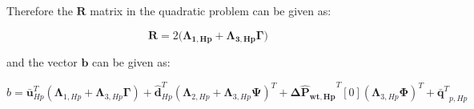 Therefore the $\bm{R}$ matrix in the quadratic problem can be given as:

\begin{equation}
  \bm{R} = 2\Big(\bm{\Lambda}_{\bm{1,Hp}} + \bm{\Lambda}_{\bm{3,Hp}} \bm{\Gamma}\Big) 
\end{equation}

and the vector $\bm{b}$ can be given as:

\begin{equation}
  b = \bm{\bar{u}}_{Hp}^{T}(\bm{\Lambda}_{1,Hp} + \bm{\Lambda}_{3,Hp} \bm{\Gamma} ) + \bm{\hat{d}}_{Hp}^{T}(\bm{\Lambda}_{2,Hp} + \bm{\Lambda}_{3,Hp} \bm{\Psi} )^{T}
  + \bm{\Delta \hat{P}_{wt,Hp}}^{T}[0] (\bm{\Lambda}_{3,Hp} \bm{\Phi})^{T} + {\bm{\bar{q}}^{T}}_{p,Hp}
\end{equation}
